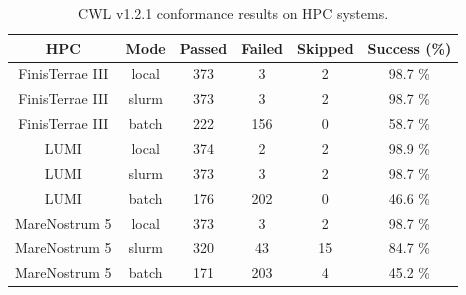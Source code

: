 \documentclass{article}
\begin{document}
\begin{table}[ht!]
\centering
\setlength{\tabcolsep}{6pt}
\renewcommand{\arraystretch}{1.2}
\begin{tabular}{|c|c|c|c|c|c|}
\hline
\rowcolor{lightgray!50}
\textbf{HPC} & \textbf{Mode} & \textbf{Passed} & \textbf{Failed} & \textbf{Skipped} & \textbf{Success (\%)} \\
\hline
FinisTerrae III & local & 373 & 3 & 2 & 98.7 \% \\
FinisTerrae III & slurm & 373 & 3 & 2 & 98.7 \% \\
FinisTerrae III & batch & 222 & 156 & 0 & 58.7 \% \\
\hline\hline
LUMI & local & 374 & 2 & 2 & 98.9 \% \\
LUMI & slurm & 373 & 3 & 2 & 98.7 \% \\
LUMI & batch & 176 & 202 & 0 & 46.6 \% \\
\hline\hline
MareNostrum 5 & local & 373 & 3 & 2 & 98.7 \% \\
MareNostrum 5 & slurm & 320 & 43 & 15 & 84.7 \% \\
MareNostrum 5 & batch & 171 & 203 & 4 & 45.2 \% \\
\hline
\end{tabular}
\caption{CWL v1.2.1 conformance results on HPC systems.}
\label{tab:toil_v12}
\end{table}
\clearpage
\end{document}
